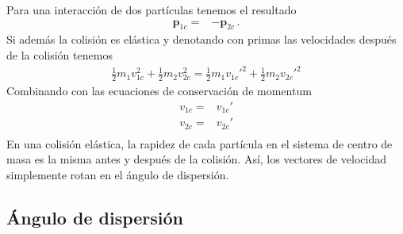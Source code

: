 Para una interacción de dos partículas tenemos el resultado
\begin{align}
  \mathbf{p}_{1c}=&-\mathbf{p}_{2c}\,.
\end{align}
Si además la colisión es elástica y denotando con primas las
velocidades después de la colisión tenemos
\begin{align}
  \tfrac{1}{2}m_1 v_{1c}^2+  \tfrac{1}{2}m_2 v_{2c}^2
= \tfrac{1}{2}m_1 {v_{1c}'}^2+ \tfrac{1}{2}{m_2 v_{2c}'}^2
\end{align}
Combinando con las ecuaciones de conservación de momentum
\begin{align}
  v_{1c}=&v_{1c}'\nonumber\\
  v_{2c}=&v_{2c}'\nonumber\\
\end{align}
En una colisión elástica, la rapidez de cada partícula en el sistema
de centro de masa es la misma antes y después de la colisión. Así, los
vectores de velocidad simplemente rotan en el ángulo de dispersión.
\begin{inprogress}


\subsection{Ángulo de dispersión}
\end{inprogress}





